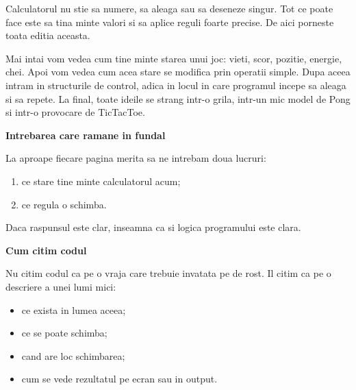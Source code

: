 \vspace{1.2em}

\begin{tcolorbox}[colback=white,colframe=black!60,boxrule=0.8pt,arc=1.5mm]
\small
Calculatorul nu stie sa numere, sa aleaga sau sa deseneze singur. Tot ce poate face este sa tina minte valori si sa aplice reguli foarte precise. De aici porneste toata editia aceasta.

Mai intai vom vedea cum tine minte starea unui joc: vieti, scor, pozitie, energie, chei. Apoi vom vedea cum acea stare se modifica prin operatii simple. Dupa aceea intram in structurile de control, adica in locul in care programul incepe sa aleaga si sa repete. La final, toate ideile se strang intr-o grila, intr-un mic model de Pong si intr-o provocare de TicTacToe.
\end{tcolorbox}

\vspace{0.8em}

\begin{tcolorbox}[colback=white,colframe=black!60,boxrule=0.8pt,arc=1.5mm]
\small
\textbf{Intrebarea care ramane in fundal}

La aproape fiecare pagina merita sa ne intrebam doua lucruri:
\begin{enumerate}
\item ce stare tine minte calculatorul acum;
\item ce regula o schimba.
\end{enumerate}

Daca raspunsul este clar, inseamna ca si logica programului este clara.
\end{tcolorbox}

\vspace{0.8em}

\begin{tcolorbox}[colback=white,colframe=black!60,boxrule=0.8pt,arc=1.5mm]
\small
\textbf{Cum citim codul}

Nu citim codul ca pe o vraja care trebuie invatata pe de rost. Il citim ca pe o descriere a unei lumi mici:
\begin{itemize}
\item ce exista in lumea aceea;
\item ce se poate schimba;
\item cand are loc schimbarea;
\item cum se vede rezultatul pe ecran sau in output.
\end{itemize}
\end{tcolorbox}

\clearpage
\pagestyle{fancy}
\color{cqtext}
